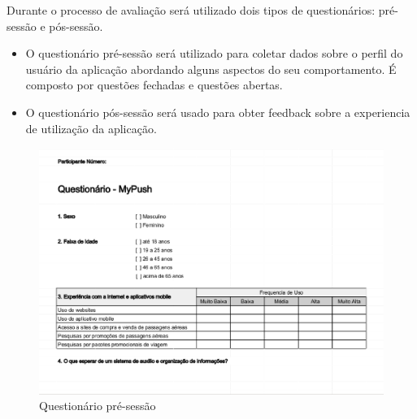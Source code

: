 Durante o processo de avaliação será utilizado dois tipos de questionários: pré-sessão e pós-sessão.
\begin{itemize}
	\item O questionário pré-sessão será utilizado para coletar dados sobre o perfil do usuário da aplicação abordando alguns aspectos do seu comportamento. É composto por questões fechadas e questões abertas.
	\item O questionário pós-sessão será usado para obter feedback sobre a experiencia de utilização da aplicação.
\end{itemize}

\begin{figure}[h]
	\centering
	\includegraphics[scale=0.5]{figuras/questionario_pre-sessao.eps}
	\caption{Questionário pré-sessão}
\end{figure}
